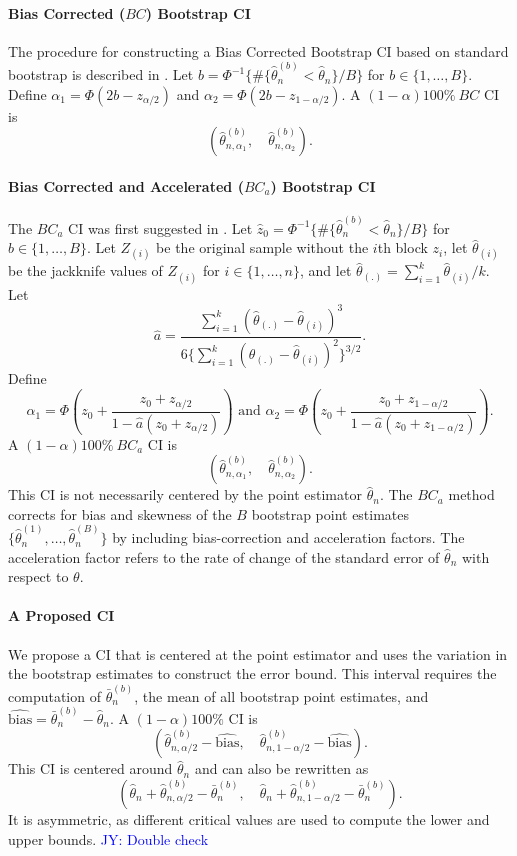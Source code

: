 \documentclass[12pt, letterpaper, titlepage]{article}
\newcommand{\jy}[1]{\textcolor{blue}{JY: #1}}
\begin{document}
\paragraph{Bias Corrected ($BC$) Bootstrap CI}
The procedure for constructing a Bias Corrected Bootstrap CI based on standard
bootstrap is described in \citet{carpenter2000bootstrap}.
Let $b = \Phi^{-1}\{\#\{\hat\theta_n^{(b)} < \hat{\theta}_n\} / B\}$
for $b \in \{1, \ldots, B\}$. Define
$\alpha_1 = \Phi(2b - z_{\alpha/2})$ and 
$\alpha_2 = \Phi(2b - z_{1 - \alpha/2})$.
A $(1 - \alpha)100\%~BC$ CI is
\[
(\hat\theta_{n, \alpha_1}^{(b)}, \quad \hat\theta_{n, \alpha_2}^{(b)}).
\]


\paragraph{Bias Corrected and Accelerated ($BC_a$) Bootstrap CI}
The $BC_a$ CI was first suggested in \citet{efron1987better}.
Let $\hat{z}_0 = \Phi^{-1}\{\#\{\hat\theta_n^{(b)} < \hat{\theta}_n\} / B\}$
for $b \in \{1, \ldots, B\}$. 
Let $Z_{(i)}$ be the original sample without the $i$th block $z_i$, let
$\hat{\theta}_{(i)}$ be the jackknife values of $Z_{(i)}$
for $i \in \{1, \ldots, n\}$, 
and let $\hat{\theta}_{(.)} = \sum_{i=1}^{k} \hat{\theta}_{(i)} / k$. 
Let 
\[
\hat{a} = \frac{\sum_{i=1}^{k} (\hat{\theta}_{(.)} -
  \hat{\theta}_{(i)})^3}{6\{\sum_{i=1}^{k} (\hat{\theta}_{(.)} -
  \hat{\theta}_{(i)})^2\}^{3/2}}.
\]
Define
\[
\alpha_1 = \Phi\left(z_0 + \frac{z_{0} +
  z_{\alpha/2}}{1 - \hat{a}(z_{0} + z_{\alpha/2})}\right)
\text{ and }
\alpha_2 = \Phi\left(z_0 + \frac{z_{0} +
  z_{1 - \alpha/2}}{1 - \hat{a}(z_{0} + z_{1 - \alpha/2})}\right).
\]
A $(1 - \alpha)100\%~BC_a$ CI is
\[
(\hat\theta_{n, \alpha_1}^{(b)}, \quad \hat\theta_{n, \alpha_2}^{(b)}).
\]
This CI is not necessarily centered by the point estimator $\hat\theta_n$. The
$BC_a$ method corrects for bias and skewness of the $B$ bootstrap point
estimates $\{\hat\theta_n^{(1)}, \ldots, \hat\theta_n^{(B)}\}$ by including
bias-correction and acceleration factors. The acceleration factor refers to
the 
rate of change of the standard error of $\hat\theta_n$ with respect to
$\theta$.


\paragraph{A Proposed CI}
We propose a CI that is centered at the point estimator and uses the variation
in the bootstrap estimates to construct the error bound. This interval requires
the computation of $\bar\theta_n^{(b)}$, the mean of all bootstrap point
estimates, and $\widehat{\text{bias}} = \bar\theta_n^{(b)} - \hat\theta_n$.
A $(1 - \alpha)100\%$ CI is
\[
(\hat\theta_{n, \alpha/2}^{(b)} - \widehat{\text{bias}}, \quad
\hat\theta_{n, 1 - \alpha/2}^{(b)} - \widehat{\text{bias}}).
\]
This CI is centered around $\hat\theta_n$ and can also be rewritten
as 
\[
(\hat\theta_n + \hat\theta_{n, \alpha/2}^{(b)} - \bar\theta_n^{(b)}, \quad
\hat\theta_n + \hat\theta_{n, 1 - \alpha/2}^{(b)} - \bar\theta_n^{(b)}).
\]
It is asymmetric, as different critical values are used to compute
the lower and upper bounds.
\jy{Double check}
\end{document}

